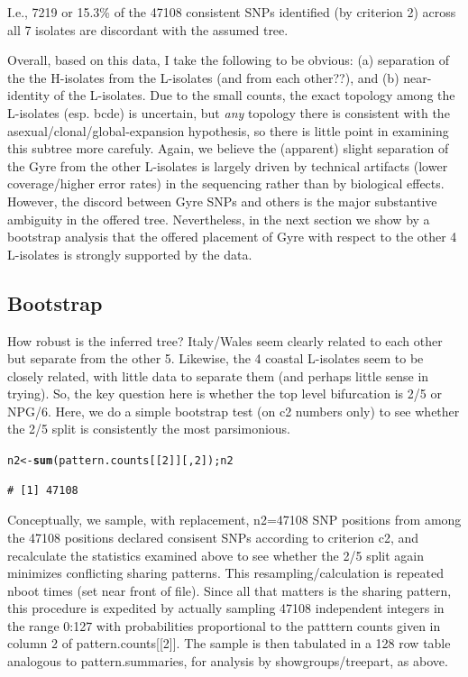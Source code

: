 \documentclass{article}\usepackage[]{graphicx}\usepackage[]{color}
\makeatletter
\newcommand{\hlnum}[1]{\textcolor[rgb]{0.686,0.059,0.569}{#1}}%
\newcommand{\hlstd}[1]{\textcolor[rgb]{0.345,0.345,0.345}{#1}}%
\newcommand{\hlkwb}[1]{\textcolor[rgb]{0.69,0.353,0.396}{#1}}%
\newcommand{\hlkwd}[1]{\textcolor[rgb]{0.737,0.353,0.396}{\textbf{#1}}}%
\newenvironment{kframe}{%
 \def\at@end@of@kframe{}%
 \ifinner\ifhmode%
  \def\at@end@of@kframe{\end{minipage}}%
  \begin{minipage}{\columnwidth}%
 \fi\fi%
 \def\FrameCommand##1{\hskip\@totalleftmargin \hskip-\fboxsep
 \colorbox{shadecolor}{##1}\hskip-\fboxsep
     \hskip-\linewidth \hskip-\@totalleftmargin \hskip\columnwidth}%
 \MakeFramed {\advance\hsize-\width
   \@totalleftmargin\z@ \linewidth\hsize
   \@setminipage}}%
 {\par\unskip\endMakeFramed%
 \at@end@of@kframe}
\newenvironment{knitrout}{}{} %
\makeatother
\begin{document}
I.e., 7219 or 15.3\% of the 47108 consistent SNPs identified (by criterion 2) across all 7 isolates are discordant with the assumed tree.

Overall, based on this data, I take the following to be obvious: (a) separation of the the H-isolates from the L-isolates (and from each other??), and (b) near-identity of the L-isolates.  Due to the small counts, the exact topology among the L-isolates (esp. bcde) is uncertain, but \emph{any} topology there is consistent with the asexual/clonal/global-expansion hypothesis, so there is little point in examining this subtree more carefuly. Again, we believe the (apparent) slight separation of the Gyre from the other L-isolates is largely driven by technical artifacts (lower coverage/higher error rates) in the sequencing rather than by biological effects.  However, the discord between Gyre SNPs and others is the major substantive ambiguity in the offered tree.  Nevertheless, in the next section we show by a bootstrap analysis that the offered placement of Gyre with respect to the other 4 L-isolates is strongly supported by the data.

\subsection{Bootstrap}
How robust is the inferred tree?  Italy/Wales seem clearly related to each other but separate from the other 5.
Likewise, the 4 coastal L-isolates seem to be closely related, with little data to separate them (and perhaps little sense in
trying).  So, the key question here is whether the top level bifurcation is 2/5 or NPG/6.  Here, we do a simple
bootstrap test (on c2 numbers only) to see whether the 2/5 split is consistently the most parsimonious.

\begin{knitrout}\footnotesize
{}\color{fgcolor}\begin{kframe}
\begin{alltt}
\hlstd{n2} \hlkwb{<-} \hlkwd{sum}\hlstd{(pattern.counts[[}\hlnum{2}\hlstd{]][,}\hlnum{2}\hlstd{]); n2}
\end{alltt}
\begin{verbatim}
# [1] 47108
\end{verbatim}
\end{kframe}
\end{knitrout}

Conceptually, we sample, with replacement, n2=47108 SNP positions from among the
47108 positions declared consisent SNPs according to criterion c2, and recalculate the
statistics examined above to see whether the 2/5 split again minimizes conflicting sharing patterns.  This
resampling/calculation is repeated nboot times (set near front of file). Since all that matters is the sharing pattern, this
procedure is expedited by actually sampling 47108 independent integers in the range 0:127 with
probabilities proportional to the patttern counts given in column 2 of pattern.counts[[2]].  The sample is then
tabulated in a 128 row table analogous to pattern.summaries, for analysis by showgroups/treepart, as above.
\end{document}
